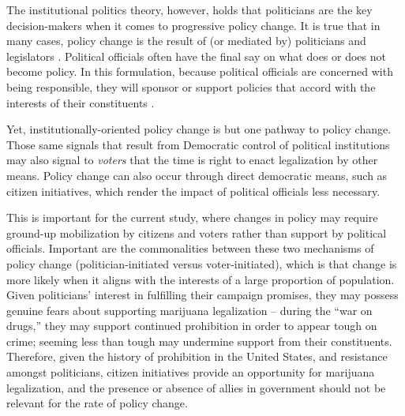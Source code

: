 

The institutional politics theory, however, holds that politicians are the key decision-makers when it comes to progressive policy change. It is true that in many cases, policy change is the result of (or mediated by) politicians and legislators \citep{amenta_et_al_1994,amenta_2006}. Political officials often have the final say on what does or does not become policy. In this formulation, because political officials are concerned with being responsible, they will sponsor or support policies that accord with the interests of their constituents \citep{amenta_and_elliott_2019,page_and_shapiro_1983,mayhew_1974,downs_1957,stimson_et_al_1995}. 

Yet, institutionally-oriented policy change is but one pathway to policy change. Those same signals that result from Democratic control of political institutions may also signal to \textit{voters} that the time is right to enact legalization by other means. Policy change can also occur through direct democratic means, such as citizen initiatives, which render the impact of political officials less necessary. 


This is important for the current study, where changes in policy may require ground-up mobilization by citizens and voters rather than support by political officials. Important are the commonalities between these two mechanisms of policy change (politician-initiated versus voter-initiated), which is that change is more likely when it aligns with the interests of a large proportion of population. Given politicians' interest in fulfilling their campaign promises, they may possess genuine fears about supporting marijuana legalization -- during the ``war on drugs,'' they may support continued prohibition in order to appear tough on crime; seeming less than tough may undermine support from their constituents. Therefore, given the history of prohibition in the United States, and resistance amongst politicians, citizen initiatives provide an opportunity for marijuana legalization, and the presence or absence of allies in government should not be relevant for the rate of policy change. 


